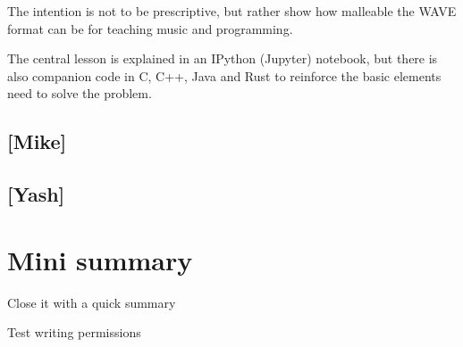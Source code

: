 The intention is not to be prescriptive, but rather show how malleable the WAVE format can be for teaching music and programming.


The central lesson is explained in an IPython (Jupyter) notebook, but there is also companion code in C, C++, Java and Rust to reinforce the basic elements need to solve the problem.


\subsection{[Mike]}

\subsection{[Yash]}


\section{Mini summary}
Close it with a quick summary

Test writing permissions

